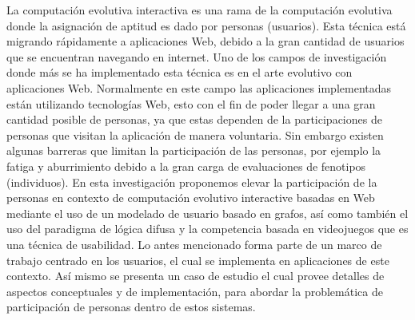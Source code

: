 
%



La computaci\'on evolutiva interactiva es una rama de la computaci\'on evolutiva
donde la asignaci\'on de aptitud es dado por personas (usuarios). Esta t\'ecnica
est\'a migrando r\'apidamente a aplicaciones Web, debido a la gran cantidad de
usuarios que se encuentran navegando en internet. Uno de los campos de
investigaci\'on donde m\'as  se ha implementado  esta t\'ecnica es en el arte
evolutivo con aplicaciones Web. Normalmente en este campo las aplicaciones
implementadas est\'an utilizando tecnolog\'ias Web, esto con el fin de poder llegar
a una gran cantidad posible de personas, ya que estas  dependen de la
participaciones de personas que visitan la aplicaci\'on de manera voluntaria. Sin
embargo existen algunas barreras que limitan la participaci\'on de las personas,
por ejemplo la fatiga y aburrimiento debido a la gran carga de evaluaciones de
fenotipos (individuos). En esta investigaci\'on proponemos elevar la participaci\'on
de la personas en contexto de computaci\'on evolutivo interactive basadas en Web
mediante el uso de un modelado de usuario basado en grafos, as\'i como tambi\'en el
uso del paradigma de l\'ogica difusa y la competencia basada en videojuegos que es
una t\'ecnica de usabilidad. Lo antes mencionado forma parte de un marco de
trabajo centrado en los usuarios, el cual se implementa en aplicaciones de este
contexto.  As\'i mismo se presenta un caso de estudio el cual provee detalles de
aspectos conceptuales y de implementaci\'on, para abordar la problem\'atica de
participaci\'on de personas dentro de estos sistemas.



